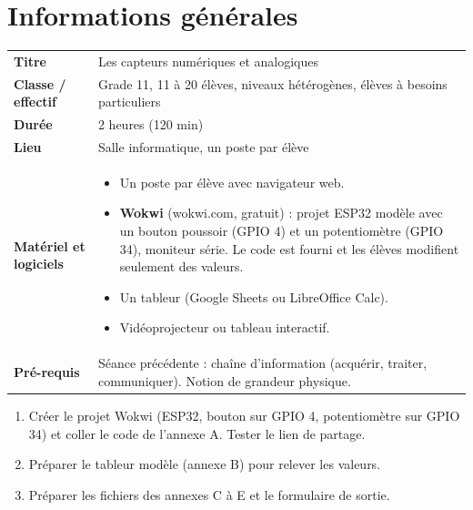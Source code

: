 \documentclass[11pt,a4paper]{article}
\begin{document}

\section{Informations générales}
\begin{tabularx}{\linewidth}{>{\bfseries}p{3.6cm}Y}
\toprule
Titre & Les capteurs numériques et analogiques\\
Classe / effectif & Grade 11, 11 à 20 élèves, niveaux hétérogènes, élèves à besoins particuliers\\
Durée & 2 heures (120 min)\\
Lieu & Salle informatique, un poste par élève\\
Matériel et logiciels &
\begin{itemize}
 \item Un poste par élève avec navigateur web.
 \item \textbf{Wokwi} (wokwi.com, gratuit) : projet ESP32 modèle avec un bouton poussoir (GPIO 4) et un potentiomètre (GPIO 34), moniteur série. Le code est fourni et les élèves modifient seulement des valeurs.
 \item Un tableur (Google Sheets ou LibreOffice Calc).
 \item Vidéoprojecteur ou tableau interactif.
\end{itemize}\\
Pré-requis &
Séance précédente : chaîne d'information (acquérir, traiter, communiquer). Notion de grandeur physique.\\
\bottomrule
\end{tabularx}

\begin{astuce}
\begin{enumerate}
 \item Créer le projet Wokwi (ESP32, bouton sur GPIO 4, potentiomètre sur GPIO 34) et coller le code de l'annexe A. Tester le lien de partage.
 \item Préparer le tableur modèle (annexe B) pour relever les valeurs.
 \item Préparer les fichiers des annexes C à E et le formulaire de sortie.
\end{enumerate}
\end{astuce}

\end{document}
